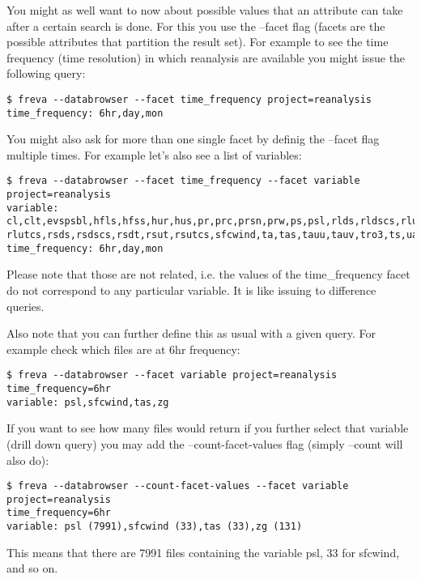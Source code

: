 \documentclass[a4paper,11pt]{ltxdoc}
\begin{document}
You might as well want to now about possible values that an attribute can take after a certain search is done. For this you use the --facet flag (facets are the possible attributes that partition the result set). For example to see the time frequency (time resolution) in which reanalysis are available you might issue the following query:
\begin{verbatim}
$ freva --databrowser --facet time_frequency project=reanalysis
time_frequency: 6hr,day,mon
\end{verbatim}
You might also ask for more than one single facet by definig the --facet flag multiple times. For example let's also see a list of variables:
\begin{verbatim}
$ freva --databrowser --facet time_frequency --facet variable project=reanalysis
variable: cl,clt,evspsbl,hfls,hfss,hur,hus,pr,prc,prsn,prw,ps,psl,rlds,rldscs,rlus,rlut,
rlutcs,rsds,rsdscs,rsdt,rsut,rsutcs,sfcwind,ta,tas,tauu,tauv,tro3,ts,ua,uas,va,vas,wap,zg
time_frequency: 6hr,day,mon
\end{verbatim}
Please note that those are not related, i.e. the values of the time\_frequency facet do not correspond to any particular variable. It is like issuing to difference queries.

Also note that you can further define this as usual with a given query. For example check which files are at 6hr frequency:
\begin{verbatim}
$ freva --databrowser --facet variable project=reanalysis time_frequency=6hr
variable: psl,sfcwind,tas,zg
\end{verbatim}
If you want to see how many files would return if you further select that variable (drill down query) you may add the --count-facet-values flag (simply --count will also do):
\begin{verbatim}
$ freva --databrowser --count-facet-values --facet variable project=reanalysis 
time_frequency=6hr
variable: psl (7991),sfcwind (33),tas (33),zg (131)
\end{verbatim}
This means that there are 7991 files containing the variable psl, 33 for sfcwind, and so on.
\end{document}
